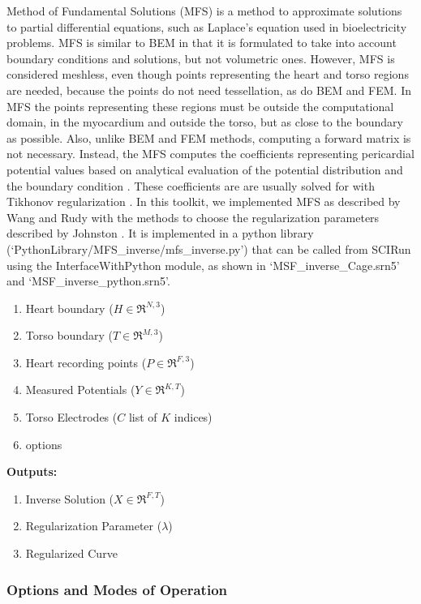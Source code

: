 Method of Fundamental Solutions (MFS) is a method to approximate
solutions to partial differential equations, such as Laplace's
equation used in bioelectricity problems.  MFS is similar to BEM in
that it is formulated to take into account boundary conditions and
solutions, but not volumetric ones.  However, MFS is considered
meshless, even though points representing the heart and torso regions
are needed, because the points do not need tessellation, as do BEM and
FEM. In MFS the points representing these regions must be outside the
computational domain, \ie{} in the myocardium and outside the torso,
but as close to the boundary as possible.  Also, unlike BEM and FEM
methods, computing a forward matrix is not necessary.  Instead, the
MFS computes the coefficients representing pericardial potential
values based on analytical evaluation of the potential distribution
and the boundary condition \cite{JDT:Mat77,JDT:Wan2006}.  These
coefficients are are usually solved for with Tikhonov regularization
\cite{JDT:Wan2006,JDT:Joh2018}.  In this toolkit, we implemented MFS
as described by Wang and Rudy \cite{JDT:Wan2006} with the methods to
choose the regularization parameters described by Johnston
\cite{JDT:Joh2018}.  It is implemented in a python library
(`PythonLibrary/MFS_inverse/mfs_inverse.py') that can be called from
SCIRun using the InterfaceWithPython module, as shown in
`MSF_inverse_Cage.srn5' and `MSF_inverse_python.srn5'.

    \begin{enumerate}
        \item Heart boundary ($H\in\Re^{N,3}$)
        \item Torso boundary ($T\in\Re^{M,3}$)
		\item Heart recording points ($P\in\Re^{F,3}$)
		\item Measured Potentials ($Y\in\Re^{K,T}$)
		\item Torso Electrodes ($C$ list of $K$ indices)
        \item options
    \end{enumerate}
    {\bf Outputs:}
     \begin{enumerate}
        \item Inverse Solution ($X\in\Re^{F,T}$)
        \item Regularization Parameter ($\lambda$)
        \item Regularized Curve 
    \end{enumerate}
	

\subsubsection{Options and Modes of Operation}

